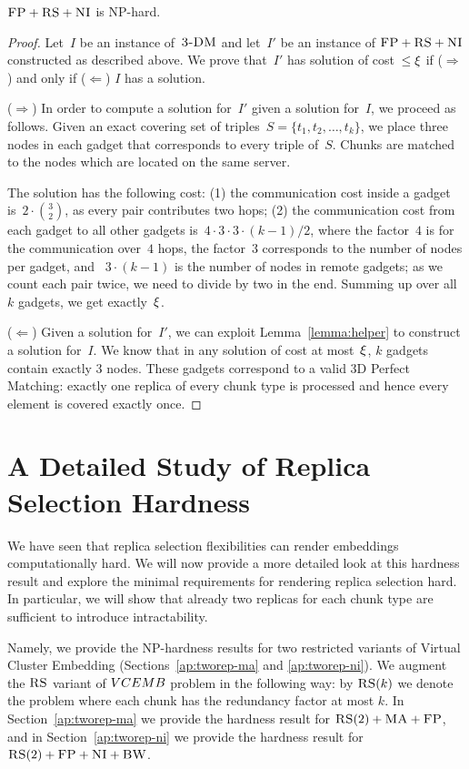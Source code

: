 \begin{theorem}
\label{theorem:fp_rs_cc}
$\textsc{FP}+\textsc{RS}+\textsc{NI}$ is NP-hard.
\end{theorem}
\begin{proof}
Let~$I$ be an instance of~$\textsc{3-DM}$ and let~$I'$ be an instance of
$\textsc{FP}+\textsc{RS}+\textsc{NI}$ constructed as described above.
We prove that~$I'$ has solution of cost~$\leq \xi$ if ($\Rightarrow$) and only if
($\Leftarrow$)
$I$ has a solution.

($\Rightarrow$) In order to compute a solution
for~$I'$ given a solution for~$I$, we proceed as follows.
Given an exact covering set of triples~$S = \{t_1, t_2,
\ldots, t_k\}$, we place three nodes in each gadget that
corresponds to every triple of~$S$. Chunks are matched to the nodes which are located
on the same server.

The solution has the following cost:
(1) the communication cost inside a gadget is~$2 \cdot {3 \choose 2}$,
  as every pair contributes two hops;
  (2) the communication cost from each gadget to all other gadgets is~$4
  \cdot 3 \cdot 3 \cdot (k - 1) / 2$, where the factor~$4$ is
  for the
  communication over~$4$ hops, the factor~$3$
  corresponds to the number of nodes per gadget, and
 ~$3 \cdot (k-1)$ is the number of nodes in remote gadgets;
  as we count each pair twice, we need to divide by two in the end.
Summing up over all~$k$ gadgets, we get exactly~$\xi$.

($\Leftarrow$) Given a solution for~$I'$,
we can exploit Lemma~\ref{lemma:helper} to construct a solution for~$I$.
We know that in any solution of cost at most~$\xi$,
$k$ gadgets contain exactly 3 nodes. These gadgets correspond to a valid
3D Perfect Matching: exactly one replica of every chunk type is processed and
hence every element is covered exactly once.
\end{proof}


\section{A Detailed Study of Replica Selection Hardness}\label{ap:tworep}
We have seen that replica selection flexibilities can render embeddings computationally hard.
We will now provide a more detailed look at this hardness result
and explore the minimal requirements for rendering replica selection hard.
In particular, we will show that already two replicas for each chunk type are sufficient to
introduce intractability.

Namely, we provide the NP-hardness results for two restricted variants of Virtual Cluster Embedding (Sections~\ref{ap:tworep-ma} and \ref{ap:tworep-ni}).
We augment the $\textsc{RS}$ variant of $VCEMB$ problem in the following way: by $\textsc{RS}(k)$ we denote the problem where each chunk has the redundancy factor at most $k$.
In Section~\ref{ap:tworep-ma} we provide the hardness result for $\textsc{RS}(2)+\textsc{MA}+\textsc{FP}$, and in Section~\ref{ap:tworep-ni} we provide the hardness result for $\textsc{RS}(2)+\textsc{FP}+\textsc{NI}+\textsc{BW}$.

